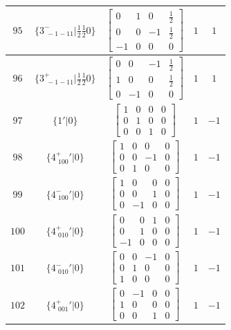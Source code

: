 \documentclass[fleqn,8pt]{jsarticle}
\begin{document}
\begin{longtable}{ccccc}
$ 95 $ & $ \{3^{-}_{\,\,-1-11}|\frac{1}{2} \frac{1}{2} 0\} $ & $ \begin{bmatrix} 0 & 1 & 0 & \frac{1}{2} \\ 0 & 0 & -1 & \frac{1}{2} \\ -1 & 0 & 0 & 0 \end{bmatrix} $ & $ 1 $ & $ 1 $ \\ \hline
$ 96 $ & $ \{3^{+}_{\,\,-1-11}|\frac{1}{2} \frac{1}{2} 0\} $ & $ \begin{bmatrix} 0 & 0 & -1 & \frac{1}{2} \\ 1 & 0 & 0 & \frac{1}{2} \\ 0 & -1 & 0 & 0 \end{bmatrix} $ & $ 1 $ & $ 1 $ \\ \hline
$ 97 $ & $ \{1{}'|0\} $ & $ \begin{bmatrix} 1 & 0 & 0 & 0 \\ 0 & 1 & 0 & 0 \\ 0 & 0 & 1 & 0 \end{bmatrix} $ & $ 1 $ & $ -1 $ \\ \hline
$ 98 $ & $ \{4^{+}_{\,\,100}{}'|0\} $ & $ \begin{bmatrix} 1 & 0 & 0 & 0 \\ 0 & 0 & -1 & 0 \\ 0 & 1 & 0 & 0 \end{bmatrix} $ & $ 1 $ & $ -1 $ \\ \hline
$ 99 $ & $ \{4^{-}_{\,\,100}{}'|0\} $ & $ \begin{bmatrix} 1 & 0 & 0 & 0 \\ 0 & 0 & 1 & 0 \\ 0 & -1 & 0 & 0 \end{bmatrix} $ & $ 1 $ & $ -1 $ \\ \hline
$ 100 $ & $ \{4^{+}_{\,\,010}{}'|0\} $ & $ \begin{bmatrix} 0 & 0 & 1 & 0 \\ 0 & 1 & 0 & 0 \\ -1 & 0 & 0 & 0 \end{bmatrix} $ & $ 1 $ & $ -1 $ \\ \hline
$ 101 $ & $ \{4^{-}_{\,\,010}{}'|0\} $ & $ \begin{bmatrix} 0 & 0 & -1 & 0 \\ 0 & 1 & 0 & 0 \\ 1 & 0 & 0 & 0 \end{bmatrix} $ & $ 1 $ & $ -1 $ \\ \hline
$ 102 $ & $ \{4^{+}_{\,\,001}{}'|0\} $ & $ \begin{bmatrix} 0 & -1 & 0 & 0 \\ 1 & 0 & 0 & 0 \\ 0 & 0 & 1 & 0 \end{bmatrix} $ & $ 1 $ & $ -1 $ \\ \hline

\end{longtable}
\end{document}
